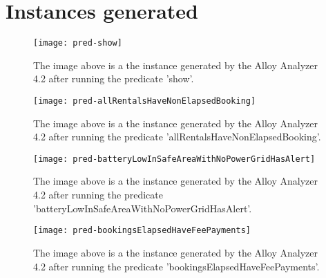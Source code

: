 \section{Instances generated}

\begin{figure}[H]
	\centering
	\texttt{[image: pred-show]}
	\caption[Predicate instance - Show]{The image above is a the instance generated by the Alloy Analyzer 4.2 after running the predicate 'show'.}
	\label{fig:pred-show}
\end{figure}

\newpage

\begin{figure}[H]
	\centering
	\texttt{[image: pred-allRentalsHaveNonElapsedBooking]}
	\caption[Predicate instance - All rentals have non elapsed booking]{The image above is a the instance generated by the Alloy Analyzer 4.2 after running the predicate 'allRentalsHaveNonElapsedBooking'.}
	\label{fig:pred-allRentalsHaveNonElapsedBooking}
\end{figure}

\newpage

\begin{figure}[H]
	\centering
	\texttt{[image: pred-batteryLowInSafeAreaWithNoPowerGridHasAlert]}
	\caption[Predicate instance - Battery low in safe area with no power grid has alert]{The image above is a the instance generated by the Alloy Analyzer 4.2 after running the predicate 'batteryLowInSafeAreaWithNoPowerGridHasAlert'.}
	\label{fig:pred-batteryLowInSafeAreaWithNoPowerGridHasAlert}
\end{figure}

\newpage

\begin{figure}[H]
	\centering
	\texttt{[image: pred-bookingsElapsedHaveFeePayments]}
	\caption[Predicate instance - Bookings elapsed have fee payments]{The image above is a the instance generated by the Alloy Analyzer 4.2 after running the predicate 'bookingsElapsedHaveFeePayments'.}
	\label{fig:pred-bookingsElapsedHaveFeePayments}
\end{figure}
